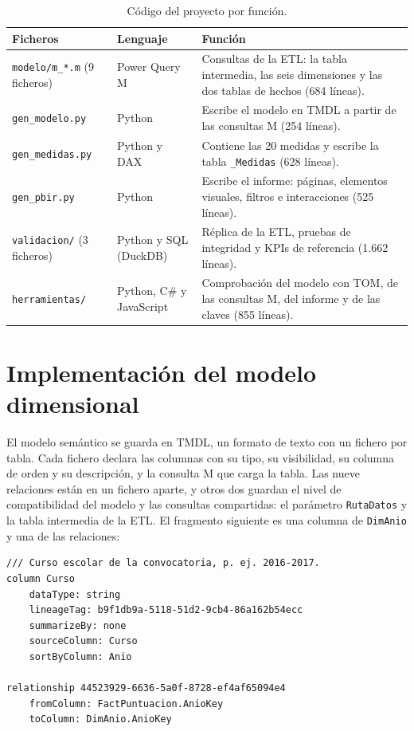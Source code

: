 \documentclass[12pt, a4paper, oneside]{report}
\begin{document}
\begin{table}[H]
\centering
\small
{}\renewcommand{\arraystretch}{1.1}
\begin{tabularx}{\textwidth}{@{} >{\raggedright\arraybackslash}p{4.2cm} >{\raggedright\arraybackslash}p{2.4cm} X @{}}
\toprule
\textbf{Ficheros} & \textbf{Lenguaje} & \textbf{Función} \\ \midrule
\texttt{modelo/m\_*.m} (9 ficheros) & Power Query M & Consultas de la ETL: la tabla intermedia, las seis dimensiones y las dos tablas de hechos (684 líneas). \\ \addlinespace
\texttt{gen\_modelo.py} & Python & Escribe el modelo en TMDL a partir de las consultas M (254 líneas). \\ \addlinespace
\texttt{gen\_medidas.py} & Python y DAX & Contiene las 20 medidas y escribe la tabla \texttt{\_Medidas} (628 líneas). \\ \addlinespace
\texttt{gen\_pbir.py} & Python & Escribe el informe: páginas, elementos visuales, filtros e interacciones (525 líneas). \\ \addlinespace
\texttt{validacion/} (3 ficheros) & Python y SQL (DuckDB) & Réplica de la ETL, pruebas de integridad y KPIs de referencia (1.662 líneas). \\ \addlinespace
\texttt{herramientas/} & Python, C\# y JavaScript & Comprobación del modelo con TOM, de las consultas M, del informe y de las claves (855 líneas). \\ \bottomrule
\end{tabularx}
\caption{Código del proyecto por función.}
\label{tab:codigo}
\end{table}

\section{Implementación del modelo dimensional}
\label{sec:impl_modelo}
El modelo semántico se guarda en TMDL, un formato de texto con un fichero por tabla. Cada fichero declara las columnas con su tipo, su visibilidad, su columna de orden y su descripción, y la consulta M que carga la tabla. Las nueve relaciones están en un fichero aparte, y otros dos guardan el nivel de compatibilidad del modelo y las consultas compartidas: el parámetro \texttt{RutaDatos} y la tabla intermedia de la ETL. El fragmento siguiente es una columna de \texttt{DimAnio} y una de las relaciones:

\par\vspace{2ex}\noindent\begin{minipage}{\textwidth}\small{}
\begin{verbatim}
/// Curso escolar de la convocatoria, p. ej. 2016-2017.
column Curso
    dataType: string
    lineageTag: b9f1db9a-5118-51d2-9cb4-86a162b54ecc
    summarizeBy: none
    sourceColumn: Curso
    sortByColumn: Anio

relationship 44523929-6636-5a0f-8728-ef4af65094e4
    fromColumn: FactPuntuacion.AnioKey
    toColumn: DimAnio.AnioKey
\end{verbatim}
\end{minipage}\par\vspace{2.5ex}
\end{document}
